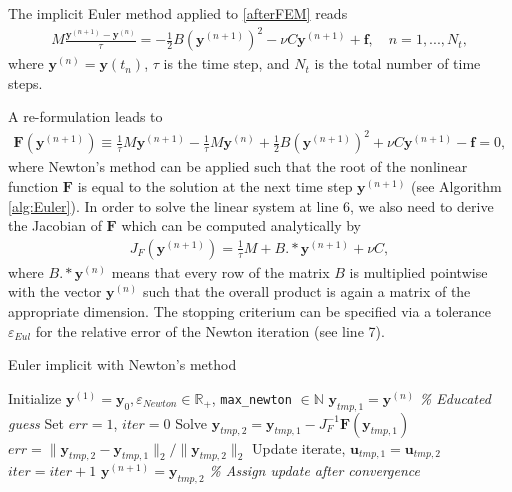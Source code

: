 The implicit Euler method applied to \eqref{afterFEM} reads
\begin{align*}
M \frac{\mathbf{y}^{(n+1)} - \mathbf{y}^{(n)}}{\tau} = -\frac{1}{2} B (\mathbf{y}^{(n+1)})^2 - \nu C \mathbf{y}^{(n+1)} + \mathbf{f}, \quad n=1,...,N_t,
\end{align*}
where $\mathbf{y}^{(n)} = \mathbf{y}(t_n)$, $\tau$ is the time step, and $N_t$ is the total number of time steps.

A re-formulation leads to
\begin{align*}
 \mathbf{F}(\mathbf{y}^{(n+1)}) \equiv \frac{1}{\tau}M\mathbf{y}^{(n+1)} - \frac{1}{\tau}M\mathbf{y}^{(n)} + \frac{1}{2} B (\mathbf{y}^{(n+1)})^2 + \nu C \mathbf{y}^{(n+1)} - \mathbf{f}= 0,
\end{align*}
where Newton's method can be applied such that the root of the nonlinear function $\mathbf{F}$ is equal to the solution at the next time step $\mathbf{y}^{(n+1)}$ (see Algorithm \ref{alg:Euler}). In order to solve the linear system at line 6, we also need to derive the Jacobian of $\mathbf{F}$ which can be computed analytically by
\begin{align*}
J_F(\mathbf{y}^{(n+1)}) = \frac{1}{\tau} M + B .* \mathbf{y}^{(n+1)} + \nu C,
\end{align*}
where $B .* \mathbf{y}^{(n)}$ means that every row of the matrix $B$ is multiplied pointwise with the vector $\mathbf{y}^{(n)}$ such that the overall product is again a matrix of the appropriate dimension. The stopping criterium can be specified via a tolerance $\varepsilon_{Eul}$ for the relative error of the Newton iteration (see line 7).
\begin{algorithm}[H]
\caption{Euler implicit with Newton's method}
\label{alg:Euler}
\begin{algorithmic}[1]
\STATE Initialize $\mathbf{y}^{(1)} = \mathbf{y}_0, \varepsilon_{Newton} \in \mathbb{R}_+$, \texttt{max\_newton} $\in \mathbb{N}$
\STATE $\mathbf{y}_{tmp,1} = \mathbf{y}^{(n)}$ \quad \textit{\% Educated guess}
\STATE Set $err = 1$, $iter = 0$
\STATE Solve $\mathbf{y}_{tmp,2} = \mathbf{y}_{tmp,1} - J_F^{-1} \mathbf{F}(\mathbf{y}_{tmp,1})$
\STATE $err = \|\mathbf{y}_{tmp,2} - \mathbf{y}_{tmp,1}\|_2 / \|\mathbf{y}_{tmp,2}\|_2$
\STATE Update iterate,  $\mathbf{u}_{tmp,1} = \mathbf{u}_{tmp,2}$
\STATE $iter = iter + 1$
\ENDWHILE
\STATE $\mathbf{y}^{(n+1)} = \mathbf{y}_{tmp,2}$  \quad \textit{\% Assign update after convergence}
\ENDFOR
\end{algorithmic}
\end{algorithm} 